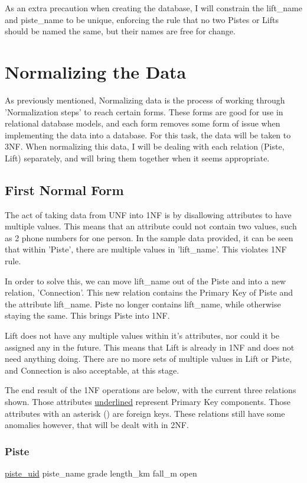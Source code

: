 \documentclass[11pt]{scrartcl} %
\begin{document}
As an extra precaution when creating the database, I will constrain the lift\_name and piste\_name to be unique, enforcing the rule that no two Pistes or Lifts should be named the same, but their names are free for change.

\newpage

\section{Normalizing the Data}
As previously mentioned, Normalizing data is the process of working through 'Normalization steps' to reach certain forms. These forms are good for use in relational database models, and each form removes some form of issue when implementing the data into a database. For this task, the data will be taken to 3NF. When normalizing this data, I will be dealing with each relation (Piste, Lift) separately, and will bring them together when it seems appropriate.
\subsection{First Normal Form}
The act of taking data from UNF into 1NF is by disallowing attributes to have multiple values. This means that an attribute could not contain two values, such as 2 phone numbers for one person. In the sample data provided, it can be seen that within 'Piste', there are multiple values in 'lift\_name'. This violates 1NF rule.

In order to solve this, we can move lift\_name out of the Piste and into a new relation, 'Connection'. This new relation contains the Primary Key of Piste and the attribute lift\_name. Piste no longer contains lift\_name, while otherwise staying the same. This brings Piste into 1NF.

Lift does not have any multiple values within it's attributes, nor could it be assigned any in the future. This means that Lift is already in 1NF and does not need anything doing. There are no more sets of multiple values in Lift or Piste, and Connection is also acceptable, at this stage.

The end result of the 1NF operations are below, with the current three relations shown. Those attributes \underline{underlined} represent Primary Key components. Those attributes with an asterisk (\*) are foreign keys. These relations still have some anomalies however, that will be dealt with in 2NF.

\subsubsection{Piste}
\underline{piste\_uid}\newline
piste\_name\newline
grade\newline
length\_km\newline
fall\_m\newline
open
\end{document}
